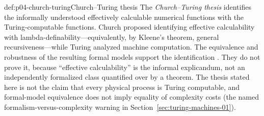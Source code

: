 \begin{proofboundary}{def:p04-church-turing}{Church--Turing thesis}
The \emph{Church--Turing thesis} identifies the informally understood
effectively calculable numerical functions with the Turing-computable
functions.  Church proposed identifying effective calculability with
lambda-definability---equivalently, by Kleene's theorem, general
recursiveness---while Turing analyzed machine computation.  The equivalence
and robustness of the resulting formal models support the identification
\cite{Church1936,Kleene1936,Turing1937Lambda,
Soare1996ComputabilityRecursion}.  They do
not prove it, because ``effective calculability'' is the informal explicandum,
not an independently formalized class quantified over by a theorem.  The
thesis stated here is not the claim that every physical process is Turing
computable, and formal-model equivalence does not imply equality of complexity
costs (the named formalism-versus-complexity warning in
Section~\ref{sec:turing-machines-01}).
\end{proofboundary}
